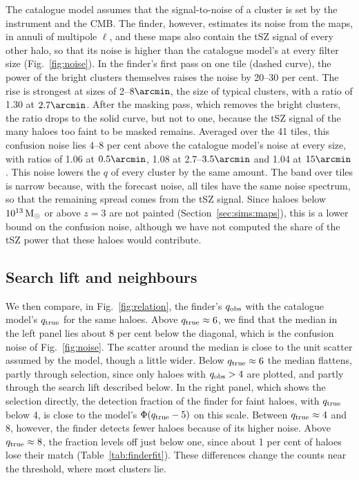 The catalogue model assumes that the signal-to-noise of a cluster is set by the instrument and the CMB. The
finder, however, estimates its noise from the maps, in annuli of multipole $\ell$, and these maps also contain
the tSZ signal of every other halo, so that its noise is higher than the catalogue model's at every filter
size (Fig.~\ref{fig:noise}). In the
finder's first pass on one tile (dashed curve), the power of the bright clusters themselves raises the noise by 20--30 per cent. The rise is strongest at sizes of 2--$8\arcmin$, the size of typical clusters, with a ratio of 1.30 at
$2.7\arcmin$. After the masking pass, which removes the bright clusters, the ratio drops to the solid curve, but
not to one, because the tSZ signal of the many haloes too faint to be masked remains. Averaged over the 41
tiles, this confusion noise lies 4--8 per cent above the catalogue model's noise at every size, with ratios of
1.06 at $0.5\arcmin$, 1.08 at 2.7--$3.5\arcmin$ and 1.04 at $15\arcmin$. This noise lowers the $q$ of every
cluster by the same amount. The band over tiles is narrow because, with the forecast noise, all tiles have
the same noise spectrum, so that the remaining spread comes from the tSZ signal. Since haloes below
$10^{13}\,\mathrm{M}_\odot$ or above $z = 3$ are not painted (Section~\ref{sec:sims:maps}), this is a lower bound on the
confusion noise, although we have not computed the share of the tSZ power that these haloes would contribute.

\subsection{Search lift and neighbours}\label{sec:finder_relation}

We then compare, in Fig.~\ref{fig:relation}, the finder's $q_\mathrm{obs}$ with the catalogue model's $q_\mathrm{true}$ for the
same haloes. Above $q_\mathrm{true} \approx 6$, we find that the median in the left panel lies about 8 per cent below the diagonal,
which is the confusion noise of Fig.~\ref{fig:noise}. The scatter around the median is close to the unit
scatter assumed by the model, though a little wider. Below $q_\mathrm{true} \approx 6$ the median flattens, partly
through selection, since only haloes with $q_\mathrm{obs} > 4$ are plotted, and partly through the search lift
described below. In the right panel, which shows the selection directly, the detection fraction of the
finder for faint haloes, with $q_\mathrm{true}$ below 4, is close to the model's $\Phi(q_\mathrm{true} - 5)$ on this scale. Between
$q_\mathrm{true} \approx 4$ and 8, however, the finder detects fewer haloes because of its higher noise. Above $q_\mathrm{true} \approx 8$, the fraction levels off just below one, since about 1 per cent of haloes lose their match
(Table~\ref{tab:finderfit}). These differences change the counts near the threshold, where most clusters
lie.


